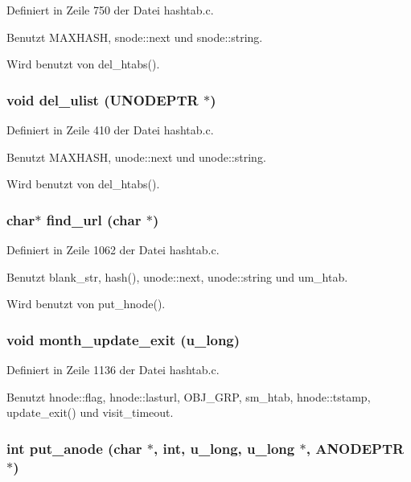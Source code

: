 Definiert in Zeile 750 der Datei hashtab.c.

Benutzt MAXHASH, snode::next und snode::string.

Wird benutzt von del\_\-htabs().
\subsubsection{\setlength{\rightskip}{0pt plus 5cm}void del\_\-ulist ({\bf UNODEPTR} $\ast$)}\label{hashtab_8h_175d4b20d25d3a0199d63f3bd6a7d0e1}




Definiert in Zeile 410 der Datei hashtab.c.

Benutzt MAXHASH, unode::next und unode::string.

Wird benutzt von del\_\-htabs().
\subsubsection{\setlength{\rightskip}{0pt plus 5cm}char$\ast$ find\_\-url (char $\ast$)}\label{hashtab_8h_d3836d00c08459b2f9811d213c4e4550}




Definiert in Zeile 1062 der Datei hashtab.c.

Benutzt blank\_\-str, hash(), unode::next, unode::string und um\_\-htab.

Wird benutzt von put\_\-hnode().
\subsubsection{\setlength{\rightskip}{0pt plus 5cm}void month\_\-update\_\-exit (u\_\-long)}\label{hashtab_8h_a516a060c822c1718d2254a425a0c033}




Definiert in Zeile 1136 der Datei hashtab.c.

Benutzt hnode::flag, hnode::lasturl, OBJ\_\-GRP, sm\_\-htab, hnode::tstamp, update\_\-exit() und visit\_\-timeout.
\subsubsection{\setlength{\rightskip}{0pt plus 5cm}int put\_\-anode (char $\ast$, int, u\_\-long, u\_\-long $\ast$, {\bf ANODEPTR} $\ast$)}\label{hashtab_8h_4d9f66275e1a624931142f32f046dd13}





